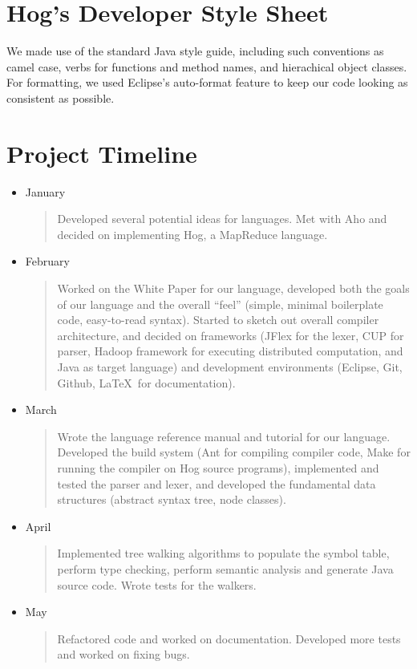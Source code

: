 \documentclass{book}
\begin{document}
\section{Hog's Developer Style Sheet}

We made use of the standard Java style guide, including such conventions as camel
case, verbs for functions and method names, and hierachical object classes. For
formatting, we used Eclipse's auto-format feature to keep our code looking as
consistent as possible. 

\section{Project Timeline}

\begin{itemize}
\item[] January
\begin{quotation}
\noindent Developed several potential ideas for languages. Met with Aho and decided on
implementing Hog, a MapReduce language.   
\end{quotation}
\item[] February
\begin{quotation}
\noindent Worked on the White Paper for our language, developed both the goals of our language
and the overall ``feel'' (simple, minimal boilerplate code, easy-to-read syntax).
Started to sketch out overall compiler architecture, and decided on frameworks
(JFlex for the lexer, CUP for parser, Hadoop framework for executing distributed computation, and Java as target language) and development environments (Eclipse, Git, Github, \LaTeX $\,$ for documentation). 
\end{quotation}
\item[] March
\begin{quotation}
\noindent Wrote the language reference manual and tutorial for our language. 
Developed the build system (Ant for compiling compiler code, Make for running
the compiler on Hog source programs), implemented and tested the parser and lexer,
and developed the fundamental data structures (abstract syntax tree, node classes).
\end{quotation}
\item[] April
\begin{quotation}
\noindent Implemented tree walking algorithms to populate the symbol table, perform
type checking, perform semantic analysis and generate Java source code. Wrote
tests for the walkers. 
\end{quotation}
\item[] May
\begin{quotation}
\noindent Refactored code and worked on documentation. Developed more tests and
worked on fixing bugs. 
\end{quotation}
\end{itemize}
\end{document}
